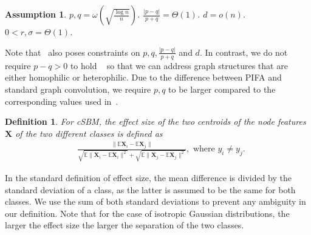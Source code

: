 \documentclass{article} %
\newtheorem{assumption}[theorem]{Assumption}
\newtheorem{definition}[theorem]{Definition}
\begin{document}
\begin{assumption}\label{ass:1}
	$p,q=\omega(\sqrt{\frac{\log n}{n}})$. $\frac{|p-q|}{p+q}=\Theta(1)$. $d=o(n)$. $0 < r,\sigma =\Theta(1)$.
\end{assumption}
Note that~\cite{baranwal2021graph} also poses constraints on $p,q, \frac{|p-q|}{p+q}$ and $d$. In contrast, we do not require $p-q>0$ to hold ~\citep{baranwal2021graph,li2019optimizing} so that we can address graph structures that are either homophilic or heterophilic. Due to the difference between PIFA and standard graph convolution, we require $p,q$ to be larger compared to the corresponding values used in~\cite{baranwal2021graph}.

\begin{definition}\label{def:eff_size}
	For cSBM, the effect size of the two centroids of the node features $\mathbf{X}$ of the two different classes is defined as
	\begin{align}
		& \frac{\|\mathbb{E}\mathbf{X}_i - \mathbb{E}\mathbf{X}_j\|}{\sqrt{\mathbb{E}\|\mathbf{X}_i-\mathbb{E}\mathbf{X}_i\|^2} + \sqrt{\mathbb{E}\|\mathbf{X}_j-\mathbb{E}\mathbf{X}_j\|^2}},\text{ where }y_i\neq y_j.
	\end{align}
\end{definition}
In the standard definition of effect size, the mean difference is divided by the standard deviation of a class, as the latter is assumed to be the same for both classes. We use the sum of both standard deviations to prevent any ambiguity in our definition. Note that for the case of isotropic Gaussian distributions, the larger the effect size the larger the separation of the two classes.
\end{document}
